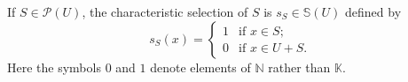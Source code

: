 If $S \in \mathcal{P}(U)$, the characteristic selection of $S$ is $s_S \in \mathbb{S}(U)$ defined by
$$s_S(x) = \begin{cases} 1 & \text{if } x \in S; \\ 0 & \text{if } x \in U + S. \end{cases}$$
Here the symbols $0$ and $1$ denote elements of $\mathbb{N}$ rather than $\mathbb{K}$.
